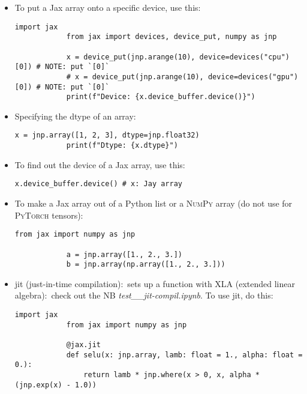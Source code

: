 \documentclass[12pt, a4paper]{article}
\numberwithin{equation}{section}
\theoremstyle{definition}
\theoremstyle{definition}
\begin{document}
	\begin{itemize}
		\item To put a Jax array onto a specific device, use this: 
		
		\begin{lstlisting}[style=mystylepython, label=alg:jax_device, caption=Device specification in Jax, xleftmargin=\parindent]
			import jax
			from jax import devices, device_put, numpy as jnp
			
			x = device_put(jnp.arange(10), device=devices("cpu")[0]) # NOTE: put `[0]`
			# x = device_put(jnp.arange(10), device=devices("gpu")[0]) # NOTE: put `[0]`
			print(f"Device: {x.device_buffer.device()}")
		\end{lstlisting}
		
		\item Specifying the dtype of an array: 
		
		\begin{lstlisting}[style=mystylepython, label=alg:jax_dtype, caption=Jax device retrieval, xleftmargin=\parindent]
			x = jnp.array([1, 2, 3], dtype=jnp.float32)
			print(f"Dtype: {x.dtype}")
		\end{lstlisting}
	
		\item To find out the device of a Jax array, use this:
		
		\begin{lstlisting}[style=mystylepython, label=alg:jax__dev_retrieval, caption=Jax device retrieval, xleftmargin=\parindent]
			x.device_buffer.device() # x: Jay array
		\end{lstlisting}
	
		\item To make a Jax array out of a Python list or a \textsc{NumPy} array  (do not use for \textsc{PyTorch} tensors): 
		
		\begin{lstlisting}[style=mystylepython, label=alg:jax_array_crea, caption=Jax array creation, xleftmargin=\parindent]
			from jax import numpy as jnp
			
			a = jnp.array([1., 2., 3.])
			b = jnp.array(np.array([1., 2., 3.]))
		\end{lstlisting}

		\item jit (just-in-time compilation):~sets up a function with XLA (extended linear algebra):~check out the NB \textit{test\_\_jit-compil.ipynb}. To use jit, do this: 
		
		\begin{lstlisting}[style=mystylepython, label=alg:jax_jit, caption=Jax array, xleftmargin=\parindent]
			import jax
			from jax import numpy as jnp
			
			@jax.jit
			def selu(x: jnp.array, lamb: float = 1., alpha: float = 0.): 
				return lamb * jnp.where(x > 0, x, alpha * (jnp.exp(x) - 1.0))
		\end{lstlisting}
	\end{itemize}
\end{document}
